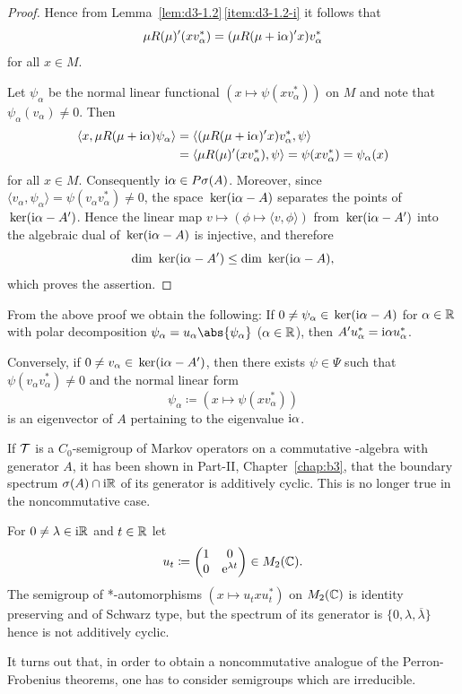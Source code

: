 \begin{proof}
Hence from Lemma~\ref{lem:d3-1.2}\,\ref{item:d3-1.2-i} it follows that
\[
\mu R(\mu)'(xv_{\alpha}^{*}) = (\mu R(\mu + \mathrm{i}\alpha)'x)v_{\alpha}^{*}
\]
for all $x \in M$.

Let $\psi_{\alpha}$ be the normal linear functional $(x \mapsto \psi(xv_{\alpha}^{*}))$ on $M$ and note that \mbox{$\psi_{\alpha}(v_{\alpha}) \neq 0$}.
Then
\begin{align*}
\langle x, \mu R(\mu + \mathrm{i}\alpha)\psi_{\alpha} \rangle &= \langle (\mu R(\mu + \mathrm{i}\alpha)'x)v_{\alpha}^{*},\psi \rangle \\
&= \langle \mu R(\mu)'(xv_{\alpha}^{*}),\psi \rangle = \psi(xv_{\alpha}^{*}) = \psi_{\alpha}(x)
\end{align*}
for all $x \in M$.
Consequently $\mathrm{i}\alpha \in P\sigma(A)$.
Moreover, since $\langle v_{\alpha}, \psi_{\alpha} \rangle = \psi(v_{\alpha}v_{\alpha}^{*}) \neq 0$, the space $\mathop{}\mathrm{ker}(\mathrm{i}\alpha - A)$ separates the points of\/ $\mathop{}\mathrm{ker}(\mathrm{i}\alpha - A')$.
Hence the linear map $v \mapsto (\phi \mapsto \langle v,\phi \rangle)$ from $\mathop{}\mathrm{ker}(\mathrm{i}\alpha - A')$ into the algebraic dual of\/ $\mathop{}\mathrm{ker}(\mathrm{i}\alpha - A)$ is injective, and therefore
\[
\dim \Kern{\im\alpha - A'} \leq \dim \Kern{\im\alpha - A} ,
\]
which proves the assertion.
\end{proof}

\begin{remark}\label{rem:d3-1.9}
From the above proof we obtain the following: If 
\mbox{$0 \neq \psi_{\alpha} \in \mathop{}\mathrm{ker}(\mathrm{i}\alpha - A)$} for $ \alpha \in \mathbb{R} $ with polar decomposition 
$\psi_{\alpha} = u_{\alpha}\abs{\psi_{\alpha}}$ ($\alpha \in \mathbb{R}$), 
then $A'u_{\alpha}^{*} = \mathrm{i}\alpha u_{\alpha}^{*}$.

Conversely, if\/ $0 \neq v_{\alpha} \in \mathop{}\mathrm{ker}(\mathrm{i}\alpha - A')$, then there exists $\psi \in \Psi$ such that 
\mbox{$\psi(v_{\alpha}v_{\alpha}^{*}) \neq 0$} and the normal linear form
\[
\psi_{\alpha} \coloneq (x \mapsto \psi(xv_{\alpha}^{*}))
\]
is an eigenvector of\/ $A$ pertaining to the eigenvalue $\mathrm{i}\alpha$.
\end{remark}
If\/ $\mathcal{T}$ is a $C_{0}$-semigroup of Markov operators on a commutative \CA-algebra with generator $A$, it has been shown in Part-II, Chapter~\ref{chap:b3},  that the boundary spectrum $\sigma(A) \cap \mathrm{i}\mathbb{R}$ of its generator is additively cyclic.
This is no longer true in the noncommutative case.
\begin{example*}\label{ex:d3-1.10}
For $0 \neq \lambda \in \mathrm{i}\mathbb{R}$ and $t \in \mathbb{R}$ let
\[
u_{t} \coloneq \begin{pmatrix} 1 & 0 \\ 
0 & \mathrm{e}^{\lambda t} \end{pmatrix} 
\in M_{2}(\mathbb{C}) .
\]
The semigroup of *-automorphisms $(x \mapsto u_{t}xu_{t}^{*})$ on $M_{2}(\mathbb{C})$ is identity preserving and of Schwarz type, but the spectrum of its generator is $\{0, \lambda, \overline{\lambda}\}$ hence is not additively cyclic.
\end{example*}
It turns out that, in order to obtain a noncommutative analogue of the Perron-Frobenius theorems, one has to consider semigroups which are irreducible.

